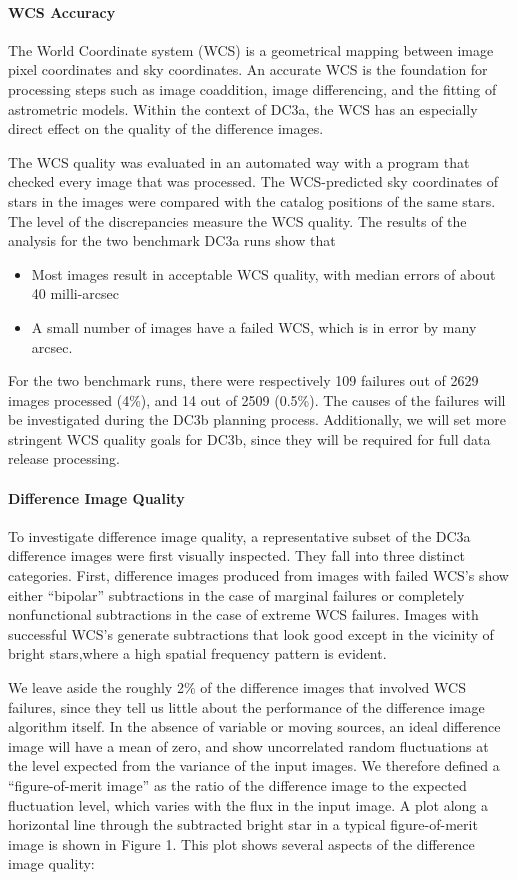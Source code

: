 \paragraph{WCS Accuracy}
The World Coordinate system (WCS) is a geometrical mapping between
image pixel coordinates and sky coordinates.  An accurate WCS is the
foundation for processing steps such as image coaddition, image
differencing, and the fitting of astrometric models. Within the
context of DC3a, the WCS has an especially direct effect on the
quality of the difference images.  

The WCS quality was evaluated in an automated way with a program that
checked every image that was processed.  The WCS-predicted sky
coordinates of stars in the images were compared with the catalog
positions of the same stars.  The level of the discrepancies measure
the WCS quality. The results of the analysis for the two benchmark
DC3a runs show that 

\begin{itemize}
\item Most images result in acceptable WCS quality, with median errors
  of about 40 milli-arcsec
\item A small number of images have a failed WCS, which is in error by
  many arcsec.
\end{itemize}
For the two benchmark runs, there were respectively 109 failures out
of 2629 images processed (4\%), and 14 out of 2509 (0.5\%).  The
causes of the failures will be investigated during the DC3b planning
process.  Additionally, we will set more stringent WCS quality goals
for DC3b, since they will be required for full data release processing.


\paragraph{Difference Image Quality}

To investigate difference image quality, a representative subset of
the DC3a difference images were first visually inspected.  They fall
into three distinct categories. First, difference images produced from
images with failed WCS's show either ``bipolar'' subtractions in the
case of marginal failures or completely nonfunctional subtractions in
the case of extreme WCS failures.  Images with successful WCS's
generate subtractions that look good except in the vicinity of bright
stars,where a high spatial frequency pattern is evident.

We leave aside the roughly 2\% of
the difference images that involved WCS failures, since they tell us
little about the performance of the difference image algorithm itself.
In the absence of variable or moving sources, an ideal difference
image will have a mean of zero, and show uncorrelated random
fluctuations at the level expected from the variance of the input
images.  We therefore defined a ``figure-of-merit image'' as the ratio
of the difference image to the expected fluctuation level, which
varies with the flux in the input image.
A plot along a horizontal line through
the subtracted bright star in a typical figure-of-merit image is shown in
Figure 1.  This plot shows several aspects of the difference
image quality:

